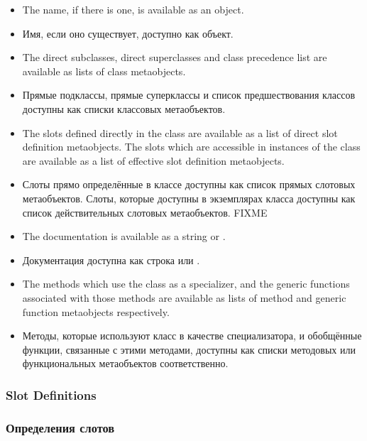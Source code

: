   \begin{itemize}
  \item 
    The name, if there is one, is available as an object.

  \item 
    Имя, если оно существует, доступно как объект.

  \item 
    The direct subclasses, direct superclasses and class precedence list are
    available as lists of class metaobjects. 

  \item 
    Прямые подклассы, прямые суперклассы и список предшествования классов
    доступны как списки классовых метаобъектов.

  \item 
    The slots defined directly in the class are available as a list of direct
    slot definition metaobjects. The slots which are accessible in instances of
    the class are available as a list of effective slot definition metaobjects.

  \item
    Слоты прямо определённые в классе доступны как список прямых слотовых
    метаобъектов. Слоты, которые доступны в экземплярах класса доступны как
    список действительных слотовых метаобъектов. FIXME

  \item 
    The documentation is available as a string or .

  \item 
    Документация доступна как строка или .

  \item 
    The methods which use the class as a specializer, and the generic functions
    associated with those methods are available as lists of method and generic
    function metaobjects respectively. 

  \item 
    Методы, которые используют класс в качестве специализатора, и обобщённые
    функции, связанные с этими методами, доступны как списки методовых или
    функциональных метаобъектов соответственно.
  \end{itemize}

\subsubsection{Slot Definitions}

\subsubsection{Определения слотов}

